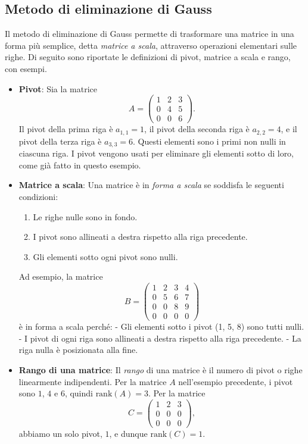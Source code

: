\documentclass{article}
\begin{document}
\subsection{Metodo di eliminazione di Gauss}

Il metodo di eliminazione di Gauss permette di trasformare una matrice in una
forma più semplice, detta \emph{matrice a scala}, attraverso operazioni
elementari sulle righe. Di seguito sono riportate le definizioni di pivot,
matrice a scala e rango, con esempi.

\begin{itemize}
	\item \textbf{Pivot}: Sia la matrice
	      \[
		      A = \begin{pmatrix}
			      1 & 2 & 3 \\
			      0 & 4 & 5 \\
			      0 & 0 & 6
		      \end{pmatrix}.
	      \]
	      Il pivot della prima riga è \( a_{1,1} = 1 \), il pivot della seconda riga è \(
	      a_{2,2} = 4 \), e il pivot della terza riga è \( a_{3,3} = 6 \). Questi
	      elementi sono i primi non nulli in ciascuna riga. I pivot vengono usati per
	      eliminare gli elementi sotto di loro, come già fatto in questo esempio.

	\item \textbf{Matrice a scala}: Una matrice è in \emph{forma a scala} se soddisfa le seguenti condizioni:
	      \begin{enumerate}
		      \item Le righe nulle sono in fondo.
		      \item I pivot sono allineati a destra rispetto alla riga precedente.
		      \item Gli elementi sotto ogni pivot sono nulli.
	      \end{enumerate}
	      Ad esempio, la matrice
	      \[
		      B = \begin{pmatrix}
			      1 & 2 & 3 & 4 \\
			      0 & 5 & 6 & 7 \\
			      0 & 0 & 8 & 9 \\
			      0 & 0 & 0 & 0
		      \end{pmatrix}
	      \]
	      è in forma a scala perché:
	      - Gli elementi sotto i pivot (1, 5, 8) sono tutti nulli.
	      - I pivot di ogni riga sono allineati a destra rispetto alla riga precedente.
	      - La riga nulla è posizionata alla fine.

	\item \textbf{Rango di una matrice}: Il \emph{rango} di una matrice è il numero di pivot
	      o righe linearmente indipendenti. Per la matrice \( A \) nell'esempio precedente,
	      i pivot sono \( 1 \), \( 4 \) e \( 6 \), quindi \( \text{rank}(A) = 3 \). Per la matrice
	      \[
		      C = \begin{pmatrix}
			      1 & 2 & 3 \\
			      0 & 0 & 0 \\
			      0 & 0 & 0
		      \end{pmatrix},
	      \]
	      abbiamo un solo pivot, \( 1 \), e dunque \( \text{rank}(C) = 1 \).
\end{itemize}
\newpage
\end{document}
